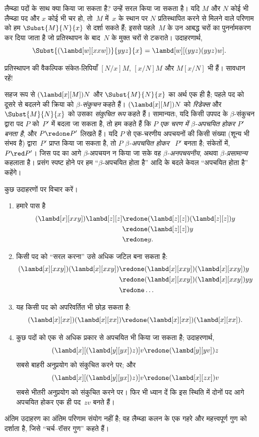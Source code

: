 \documentclass[../../../include/open-logic-section]{subfiles}
\begin{document}

लैम्ब्डा पदों के साथ क्या किया जा सकता है? उन्हें सरल किया जा सकता है। यदि
$M$ और $N$ कोई भी लैम्ब्डा पद और $x$ कोई भी चर हो, तो~$M$ में~$x$ के
स्थान पर $N$ प्रतिस्थापित करने से मिलने वाले परिणाम को हम
$\Subst{M}{N}{x}$ से दर्शा सकते हैं; इससे पहले~$M$ के उन आबद्ध चरों का
पुनर्नामकरण कर दिया जाता है जो प्रतिस्थापन के बाद~$N$ के मुक्त चरों से
टकराते। उदाहरणार्थ,
\[
\Subst{(\lambd[w][xxw])}{yyz}{x} = \lambd[w][(yyz)(yyz)w].
\]

\begin{digress}
प्रतिस्थापन की वैकल्पिक संकेत-लिपियाँ $[N/x]M$, $[x/N]M$ और $M[x/N]$ भी
हैं। सावधान रहें!
\end{digress}

सहज रूप से $(\lambd[x][M])N$ और $\Subst{M}{N}{x}$ का अर्थ एक ही है; पहले
पद को दूसरे से बदलने की क्रिया को \emph{$\beta$-संकुचन} कहते हैं।
$(\lambd[x][M])N$ को \emph{रिडेक्स} और $\Subst{M}{N}{x}$ को उसका
\emph{संकुचित रूप} कहते हैं। सामान्यतः, यदि किसी उपपद के $\beta$-संकुचन
द्वारा पद $P$ को~$P'$ में बदला जा सकता है, तो हम कहते हैं कि $P$
\emph{एक चरण में $\beta$-अपचयित होकर $P'$ बनता है}, और $P \redone P'$
लिखते हैं। यदि $P$ से एक-चरणीय अपचयनों की किसी संख्या (शून्य भी संभव है)
द्वारा~$P'$ प्राप्त किया जा सकता है, तो $P$ \emph{$\beta$-अपचयित होकर}
~$P'$ बनता है; संकेतों में, $P \red P'$। जिस पद का आगे $\beta$-अपचयन न
किया जा सके वह \emph{$\beta$-अनपचयनीय}, अथवा \emph{$\beta$-प्रसामान्य}
कहलाता है। प्रसंग स्पष्ट होने पर हम ``$\beta$-अपचयित होता है'' आदि के बदले
केवल ``अपचयित होता है'' कहेंगे।

कुछ उदाहरणों पर विचार करें।
\begin{enumerate}
\item हमारे पास है
\begin{align*}
(\lambd[x][xxy]) \lambd[z][z] & \redone (\lambd[z][z])(\lambd[z][z]) y \\
& \redone (\lambd[z][z]) y \\
& \redone y.
\end{align*}
\item किसी पद को ``सरल करना'' उसे अधिक जटिल बना सकता है:
\begin{align*}
(\lambd[x][xxy])(\lambd[x][xxy]) & \redone (\lambd[x][xxy])(\lambd[x][xxy])y \\
& \redone (\lambd[x][xxy])(\lambd[x][xxy])yy \\
& \redone \dots
\end{align*}
\item यह किसी पद को अपरिवर्तित भी छोड़ सकता है:
\[
(\lambd[x][xx])(\lambd[x][xx]) \redone (\lambd[x][xx])(\lambd[x][xx]).
\]
\item कुछ पदों को एक से अधिक प्रकार से अपचयित भी किया जा सकता है;
  उदाहरणार्थ,
\[
(\lambd[x][(\lambd[y][yx]) z)] v \redone (\lambd[y][yv]) z
\]
सबसे बाहरी अनुप्रयोग को संकुचित करने पर; और
\[
(\lambd[x][(\lambd[y][yx]) z)] v \redone (\lambd[x][zx]) v
\]
सबसे भीतरी अनुप्रयोग को संकुचित करने पर। फिर भी ध्यान दें कि इस स्थिति में
दोनों पद आगे अपचयित होकर एक ही पद~$zv$ बनते हैं।
\end{enumerate}

अंतिम उदाहरण का अंतिम परिणाम संयोग नहीं है; वह लैम्ब्डा कलन के एक गहरे और
महत्त्वपूर्ण गुण को दर्शाता है, जिसे ``चर्च--रॉसर गुण'' कहते हैं।
\end{document}
